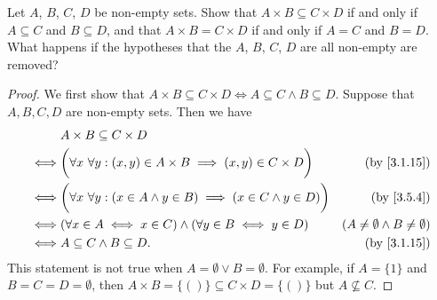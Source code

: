 \begin{ex}\label{ex:3.5.6}
  Let \(A\), \(B\), \(C\), \(D\) be non-empty sets.
  Show that \(A \times B \subseteq C \times D\) if and only if \(A \subseteq C\) and \(B \subseteq D\), and that \(A \times B = C \times D\) if and only if \(A = C\) and \(B = D\).
  What happens if the hypotheses that the \(A\), \(B\), \(C\), \(D\) are all non-empty are removed?
\end{ex}

\begin{proof}
  We first show that \(A \times B \subseteq C \times D \iff A \subseteq C \land B \subseteq D\).
  Suppose that \(A, B, C, D\) are non-empty sets.
  Then we have
  \begin{align*}
         & A \times B \subseteq C \times D                                                                                                         \\
    \iff & \bigg(\forall x \ \forall y : (x, y) \in A \times B \implies (x, y) \in C \times D\bigg)    & \text{(by \cref{3.1.15})}                 \\
    \iff & \bigg(\forall x \ \forall y :(x \in A \land y \in B) \implies (x \in C \land y \in D)\bigg) & \text{(by \cref{3.5.4})}                  \\
    \iff & (\forall x \in A \iff x \in C) \land (\forall y \in B \iff y \in D)                         & (A \neq \emptyset \land B \neq \emptyset) \\
    \iff & A \subseteq C \land B \subseteq D.                                                          & \text{(by \cref{3.1.15})}
  \end{align*}
  This statement is not true when \(A = \emptyset \lor B = \emptyset\).
  For example, if \(A = \{1\}\) and \(B = C = D = \emptyset\), then \(A \times B = \{()\} \subseteq C \times D = \{()\}\) but \(A \not \subseteq C\).


\end{proof}
